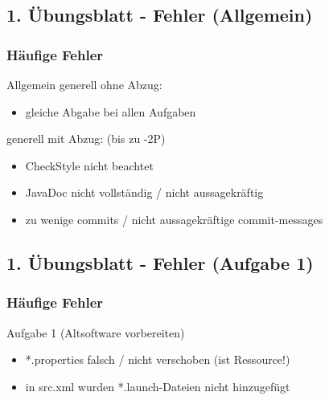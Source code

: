 \documentclass[18pt]{beamer}
\begin{document}
	\subsection{1. Übungsblatt - Fehler (Allgemein)}
	\begin{frame}
		\frametitle{Häufige Fehler}
		\begin{block}{Allgemein}
			generell ohne Abzug:
			\begin{itemize}
				\item gleiche Abgabe bei allen Aufgaben
			\end{itemize}
			generell mit Abzug: (bis zu -2P)
			\begin{itemize}
				\item  CheckStyle nicht beachtet
				\item JavaDoc nicht vollständig / nicht aussagekräftig
				\item zu wenige commits / nicht aussagekräftige commit-messages
			\end{itemize}
		\end{block}
	\end{frame}
	
	\subsection{1. Übungsblatt - Fehler (Aufgabe 1)}
	\begin{frame}
		\frametitle{Häufige Fehler}
		\begin{block}{Aufgabe 1 (Altsoftware vorbereiten)}
		\begin{itemize}
			\item *.properties falsch / nicht verschoben (ist Ressource!)
			\item in src.xml wurden *.launch-Dateien nicht hinzugefügt
		\end{itemize}
		\end{block}
	\end{frame}
	
\end{document}
